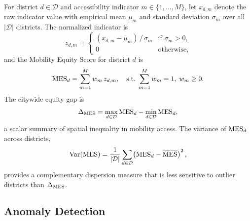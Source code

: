 For district $d \in \mathcal{D}$ and accessibility indicator
$m \in \{1, \ldots, M\}$, let $x_{d,m}$ denote the raw indicator value
with empirical mean $\mu_m$ and standard deviation $\sigma_m$ over all
$|\mathcal{D}|$ districts.
The normalized indicator is
\begin{equation}
  z_{d,m} =
  \begin{cases}
    (x_{d,m} - \mu_m)\,/\,\sigma_m & \text{if } \sigma_m > 0, \\
    0 & \text{otherwise,}
  \end{cases}
  \label{eq:zscore_district}
\end{equation}
and the Mobility Equity Score for district $d$ is
\begin{equation}
  \mathrm{MES}_d = \sum_{m=1}^{M} w_m\, z_{d,m},
  \quad \text{s.t.}\;\sum_{m=1}^{M} w_m = 1,\; w_m \geq 0.
  \label{eq:mes}
\end{equation}
The citywide equity gap is
\begin{equation}
  \Delta_{\mathrm{MES}} = \max_{d \in \mathcal{D}} \mathrm{MES}_d
                - \min_{d \in \mathcal{D}} \mathrm{MES}_d,
  \label{eq:equity_gap}
\end{equation}
a scalar summary of spatial inequality in mobility access.
The variance of $\mathrm{MES}_d$ across districts,
\begin{equation}
  \mathrm{Var}(\mathrm{MES}) = \frac{1}{|\mathcal{D}|}
    \sum_{d \in \mathcal{D}}\!\left(\mathrm{MES}_d - \overline{\mathrm{MES}}\right)^2,
  \label{eq:mes_var}
\end{equation}
provides a complementary dispersion measure that is less sensitive to
outlier districts than $\Delta_{\mathrm{MES}}$.

\subsection{Anomaly Detection}

